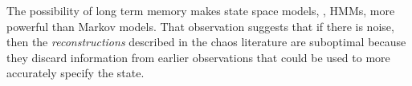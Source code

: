 The possibility of long term memory makes state space models, \eg,
HMMs, more powerful than Markov models.  That observation suggests
that if there is noise, then the \emph{ reconstructions}
described in the chaos
literature\cite{Packard80,Takens81,Fraser86,Sauer91} are suboptimal
because they discard information from earlier observations that could
be used to more accurately specify the state.

